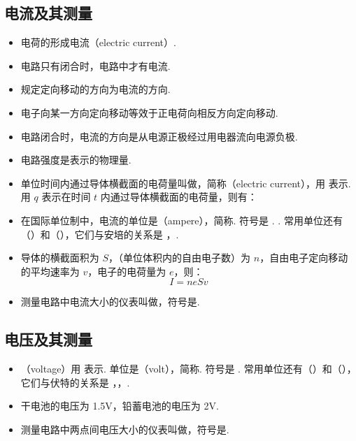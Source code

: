 \subsection{电流及其测量}
\begin{itemize}
\item 电荷的形成电流（electric current）.
\item 电路只有闭合时，电路中才有电流.
\item 规定定向移动的方向为电流的方向.
\item 电子向某一方向定向移动等效于正电荷向相反方向定向移动.
\item 电路闭合时，电流的方向是从电源正极经过用电器流向电源负极.
\item 电路强度是表示的物理量.
\item 单位时间内通过导体横截面的电荷量叫做，简称（electric current），用  表示. 用 $q$ 表示在时间 $t$ 内通过导体横截面的电荷量，则有：
\item 在国际单位制中，电流的单位是（ampere），简称. 符号是 . . 常用单位还有（）和（），它们与安培的关系是 ，.
\item 导体的横截面积为 $S$，（单位体积内的自由电子数）为 $n$，自由电子定向移动的平均速率为 $v$，电子的电荷量为 $e$，则：
$$
I=neSv
$$
\item 测量电路中电流大小的仪表叫做，符号是\ammeter.
\end{itemize}

\subsection{电压及其测量}
\begin{itemize}
\item {}（voltage）用  表示. 单位是（volt），简称. 符号是 . 常用单位还有（）和（），它们与伏特的关系是 ，，.
\item 干电池的电压为 1.5V，铅蓄电池的电压为 2V.
\item 测量电路中两点间电压大小的仪表叫做，符号是\voltmeter.
\end{itemize}

